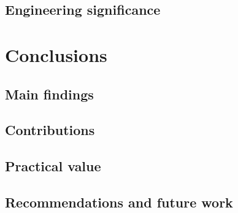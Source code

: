 \documentclass[12pt,letterpaper]{article}
\begin{document}
\subsection{Engineering significance}\label{sec44}


\clearpage

\section{Conclusions}\label{sec45}

\subsection{Main findings}\label{sec46}

\subsection{Contributions}\label{sec47}

\subsection{Practical value}\label{sec48}

\subsection{Recommendations and future work}\label{sec49}
\label{sec:bodyend}
\end{document}
